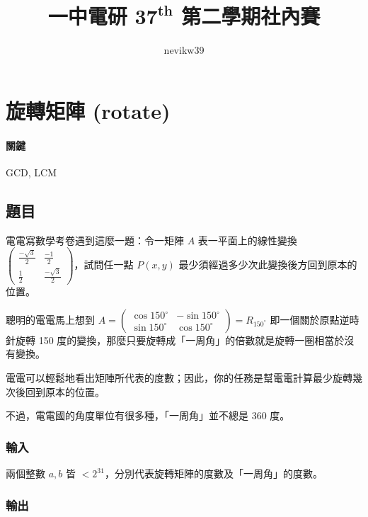 \documentclass[a4paper,10pt]{article}
\title{\fontseries{b}一中電研 $\mathbf{37^{th}}$ 第二學期社內賽 \enspace {\huge\fontseries{eb}\selectfont 題目解析}}
\author{\fontshape{it}nevikw39}
\begin{document}
\maketitle

\begin{abstract}


\end{abstract}

\section{旋轉矩陣 (rotate)}

\paragraph{關鍵} GCD, LCM

\subsection{題目}

電電寫數學考卷遇到這麼一題：令一矩陣 $A$ 表一平面上的線性變換 $\begin{pmatrix} \frac{-\sqrt{3}}{2} & \frac{-1}{2}\\ \frac{1}{2} & \frac{-\sqrt{3}}{2} \end{pmatrix}$，試問任一點 $P(x, y)$ 最少須經過多少次此變換後方回到原本的位置。

聰明的電電馬上想到 $A = \begin{pmatrix} \cos 150^{\circ} & -\sin 150^{\circ}\\ \sin 150^{\circ} & \cos 150^{\circ} \end{pmatrix} = R_{150^{\circ}}$ 即一個關於原點逆時針旋轉 150 度的變換，那麼只要旋轉成「一周角」的倍數就是旋轉一圈相當於沒有變換。

電電可以輕鬆地看出矩陣所代表的度數；因此，你的任務是幫電電計算最少旋轉幾次後回到原本的位置。

不過，電電國的角度單位有很多種，「一周角」並不總是 360 度。

\subsubsection{輸入}

兩個整數 $a, b$ 皆 $< 2^{31}$，分別代表旋轉矩陣的度數及「一周角」的度數。

\subsubsection{輸出}
\end{document}
